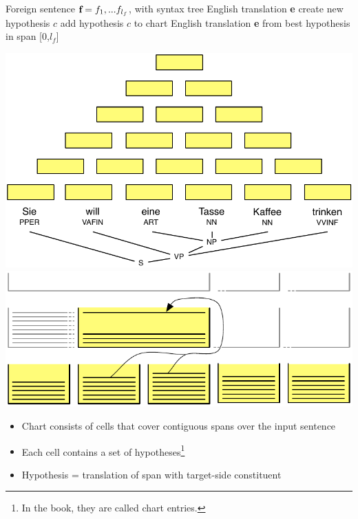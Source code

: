 \documentclass[landscape]{slides}
\renewcommand{\algorithmicrequire}{\textbf{Input:}}
\renewcommand{\algorithmicensure}{\textbf{Output:}}
\begin{document}

\vspace{15mm}
\begin{algorithmic}[1]
\renewcommand{\algorithmicrequire}{\textbf{Input:}} 
\renewcommand{\algorithmicensure}{\textbf{Output:}}
\REQUIRE Foreign sentence $\text{\bf f}=f_1,...f_{l_f}$, with syntax tree
\ENSURE English translation {\bf e}
          \STATE create new hypothesis $c$
          \STATE add hypothesis $c$ to chart
        \ENDIF
      \ENDFOR
    \ENDFOR
\ENDFOR 
\RETURN English translation {\bf e} from best hypothesis in span [0,$l_f$]
\end{algorithmic}


\begin{center} \vspace{5mm}
\includegraphics[scale=0.7]{chart-parsing-stacks.pdf} \hspace{10mm}
\includegraphics[scale=1]{chart-stacks-color.pdf}
\end{center}
\begin{itemize}
\item Chart consists of cells that cover contiguous spans over the input sentence
\item Each cell contains a set of hypotheses\footnote{In the book, they are called chart entries.}
\item Hypothesis = translation of span with target-side constituent
\end{itemize}
\end{document}
